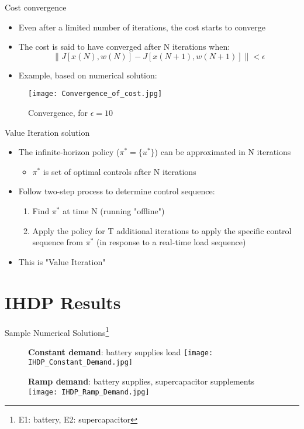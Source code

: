 \documentclass{beamer}
\newcommand{\norm}[1]{\left\lVert#1\right\rVert}
\begin{document}
\begin{frame}{Cost convergence}
\begin{itemize}
	\item Even after a limited number of iterations, the cost starts to converge
	\item The cost is said to have converged after N iterations when:
	\begin{equation}
		\norm{J[x(N),w(N)]-J[x(N+1),w(N+1)]} < \epsilon
	\end{equation}
	\item Example, based on numerical solution:
\end{itemize}
\begin{figure}
	\texttt{[image: Convergence\_of\_cost.jpg]}
	\caption{Convergence, for $\epsilon=10$}
\end{figure}
\end{frame}

\begin{frame}{Value Iteration solution}
\begin{itemize}
	\item The infinite-horizon policy  ($\pi^{*}=\{u^{*}\}$) can be approximated in N iterations
	\begin{itemize}
		\item $\pi^{*}$ is set of optimal controls after N iterations
	\end{itemize}
	\item Follow two-step process to determine control sequence:
	\begin{enumerate}
		\item Find $\pi^{*}$ at time N (running "offline")
		\item Apply the policy for T additional iterations to apply the specific control sequence from $\pi^{*}$ (in response to a real-time load sequence)
	\end{enumerate}
	\item This is "Value Iteration"
\end{itemize}
\end{frame}

\section{IHDP Results}
\begin{frame}{Sample Numerical Solutions\footnote{E1: battery, E2: supercapacitor}}
	\begin{minipage}{0.5\textwidth}
		\begin{figure}
			\textbf{Constant demand}: battery supplies load
			\texttt{[image: IHDP\_Constant\_Demand.jpg]}
		\end{figure}
	\end{minipage}\begin{minipage}{0.5\textwidth}
		\begin{figure}
			\textbf{Ramp demand}: battery supplies, supercapacitor supplements
			\texttt{[image: IHDP\_Ramp\_Demand.jpg]}
		\end{figure}
	\end{minipage}
\end{frame}
\end{document}
